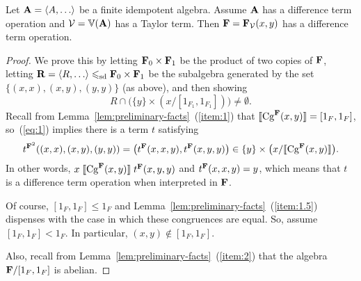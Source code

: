 \begin{theorem}
\label{thm:main-result}
Let $\bA = \<A, \dots\>$ be a finite idempotent algebra.
Assume $\mathbf{A}$ has a difference term operation and 
$\mathcal{V} = \operatorname{\mathbb{V}}(\mathbf{A})$ has a Taylor term.
Then $\mathbf{F} = \mathbf{F}_{\mathcal{V}}(x,y)$ has a difference term operation.
\end{theorem}
\begin{proof}
  
We prove this by 
letting $\mathbf{F}_0 \times \mathbf{F}_1$ be the product of two copies of $\mathbf{F}$,
letting $\bR = \<R, \dots\>  \sdp \bF_0 \times \bF_1$ be the subalgebra generated
by the set $\{(x, x), (x, y), (y, y)\}$ (as above), and then showing
\begin{equation}
  \label{eq:1}
R \cap \bigl(\{y\} \times (x/[1_{F_1},1_{F_1}])\bigr) \neq \emptyset.
\end{equation}
Recall from Lemma~\ref{lem:preliminary-facts}~(\ref{item:1}) that
$\llbracket \operatorname{Cg}^{\mathbf{F}}(x,y) \rrbracket = [1_{F},1_{F}]$, so~(\ref{eq:1})
implies there is a term $t$ satisfying
\[
t^{\mathbf{F}^2}((x,x),(x,y),(y,y)) =\bigl(t^{\mathbf{F}}(x,x,y), t^{\mathbf{F}}(x,y,y)\bigr) \in
\{y\} \times \bigl(x/\llbracket \operatorname{Cg}^{\mathbf{F}}(x,y) \rrbracket\bigr).
\]
In other words,
$x \mathrel{\llbracket \operatorname{Cg}^{\mathbf{F}}(x,y) \rrbracket} t^{\mathbf{F}}(x,y,y)$ and
$t^{\mathbf{F}}(x,x,y) = y$, which means that $t$ is a difference term operation when
interpreted in $\mathbf{F}$. 

Of course, $[1_F, 1_F]\leq 1_F$ and
Lemma~\ref{lem:preliminary-facts}~(\ref{item:1.5}) dispenses with
the case in which these congruences are equal.
So, %
assume
$[1_F, 1_F]< 1_F$.
In particular, $(x,y) \notin [1_F, 1_F]$.

Also, recall from
Lemma~\ref{lem:preliminary-facts}~(\ref{item:2}) that the
algebra $\mathbf{F}/[1_F, 1_F]$ is abelian.


\end{proof}
